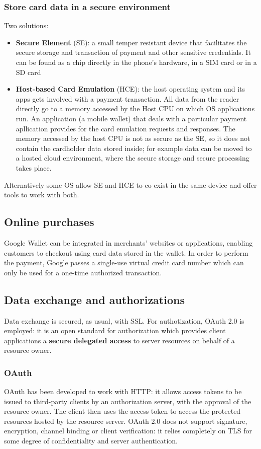 \documentclass[a4paper, 10pt, titlepage]{article}
\begin{document}
\subsubsection*{Store card data in a secure environment}
Two solutions:
\begin{itemize}
\item \textbf{Secure Element} (SE): a small temper resistant device that facilitates the secure storage and transaction of payment and other sensitive credentials. It can be found as a chip directly in the phone's hardware, in a SIM card or in a SD card
\item \textbf{Host-based Card Emulation} (HCE): the host operating system and its apps gets involved with a payment transaction. All data from the reader directly go to a memory accessed by the Host CPU on which OS applications run. An application (a mobile wallet) that deals with a particular payment apllication provides for the card emulation requests and responses. The memory accessed by the host CPU is not as secure as the SE, so it does not contain the cardholder data stored inside; for example data can be moved to a hosted cloud environment, where the secure storage and secure processing takes place.
\end{itemize}
Alternatively some OS allow SE and HCE to co-exist in the same device and offer tools to work with both.

\subsection{Online purchases}
Google Wallet can be integrated in merchants' websites or applications, enabling customers to checkout using card data stored in the wallet. In order to perform the payment, Google passes a single-use virtual credit card number which can only be used for a one-time authorized transaction.

\subsection{Data exchange and authorizations}
Data exchange is secured, as usual, with SSL. For authotization, OAuth 2.0 is employed: it is an open standard for authorization which provides client applications a \textbf{secure delegated access} to server resources on behalf of a resource owner.

\subsubsection{OAuth}
OAuth has been developed to work with HTTP: it allows access tokens to be issued to third-party clients by an authorization server, with the approval of the resource owner. The client then uses the access token to access the protected resources hosted by the resource server. OAuth 2.0 does not support signature, encryption, channel binding or client verification: it relies completely on TLS for some degree of confidentiality and server authentication.
\end{document}

